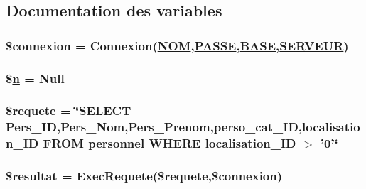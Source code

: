 \subsection{Documentation des variables}
\hypertarget{intervenants__org_8php_a1}{
\subsubsection[\$connexion]{\setlength{\rightskip}{0pt plus 5cm}\$connexion = Connexion(\hyperlink{pma__connect_8php_a0}{NOM},\hyperlink{pma__connect_8php_a1}{PASSE},\hyperlink{pma__connect_8php_a3}{BASE},\hyperlink{pma__connect_8php_a2}{SERVEUR})}}
\label{intervenants__org_8php_a1}


\hypertarget{intervenants__org_8php_a0}{
\subsubsection[\$n]{\setlength{\rightskip}{0pt plus 5cm}\$\hyperlink{utilitaires_2html_8php_a0}{n} = Null}}
\label{intervenants__org_8php_a0}


\hypertarget{intervenants__org_8php_a2}{
\subsubsection[\$requete]{\setlength{\rightskip}{0pt plus 5cm}\$requete = \char`\"{}SELECT Pers\_\-ID,Pers\_\-Nom,Pers\_\-Prenom,perso\_\-cat\_\-ID,localisation\_\-ID FROM personnel WHERE localisation\_\-ID $>$ '0'\char`\"{}}}
\label{intervenants__org_8php_a2}


\hypertarget{intervenants__org_8php_a3}{
\subsubsection[\$resultat]{\setlength{\rightskip}{0pt plus 5cm}\$resultat = Exec\-Requete(\$requete,\$connexion)}}
\label{intervenants__org_8php_a3}


